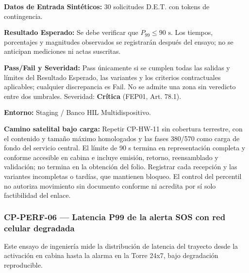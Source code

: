 \par\noindent \textbf{Datos de Entrada Sintéticos:} 30 solicitudes D.E.T. con tokens de contingencia.\par
\par\noindent \textbf{Resultado Esperado:} Se debe verificar que $P_{99} \le 90\text{ s}$. Los tiempos, porcentajes y magnitudes observados se registrarán después del ensayo; no se anticipan mediciones ni actas suscritas.\par
\par\noindent \textbf{Pass/Fail y Severidad:} Pass únicamente si se cumplen todas las salidas y límites del Resultado Esperado, las variantes y los criterios contractuales aplicables; cualquier discrepancia es Fail. No se admite una zona sin veredicto entre dos umbrales. Severidad: \textbf{Crítica} (FEP01, Art. 78.1).\par
\par\noindent \textbf{Entorno:} Staging / Banco HIL Multidispositivo.\par



\par\noindent\textbf{Camino satelital bajo carga:} Repetir CP-HW-11 sin cobertura terrestre, con el contenido y tamaño máximo homologados y las fases 380/570 como carga de fondo del servicio central. El límite de 90 s termina en representación completa y conforme accesible en cabina e incluye emisión, retorno, reensamblado y validación; no termina en la obtención del folio. Registrar cada recepción y las variantes incompletas o tardías, que mantienen bloqueo. El control del percentil no autoriza movimiento sin documento conforme ni acredita por sí solo factibilidad del enlace.\par


\subsubsection*{CP-PERF-06 — Latencia P99 de la alerta SOS con red celular degradada}\label{sec:9-cp-perf-06}
Este ensayo de ingeniería mide la distribución de latencia del trayecto desde la activación en cabina hasta la alarma en la Torre 24x7, bajo degradación reproducible.

